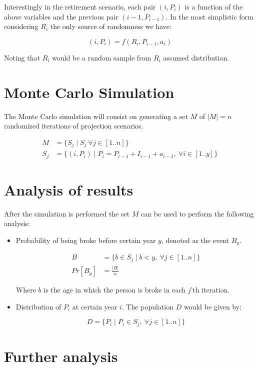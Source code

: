 \documentclass[8pt]{article}
\begin{document}
Interestingly in the retirement scenario, each pair $(i,P_i)$ is a function of the above variables and the previous pair $(i-1,P_{i-1})$.  In the most simplistic form considering \textbf{$R_i$} the only source of randomness we have:

\[ (i,P_i) = f(R_i, P_{i-1}, a_i) \]

Noting that $R_i$ would be a random sample from $R_i$ assumed distribution.

\section{Monte Carlo Simulation}

The Monte Carlo simulation will consist on generating a set $M$ of $|M|=n$ randomized iterations of projection scenarios.  

\begin{align*}
M & = \{ S_j \mid S_j ~ \forall j \in [1..n] \} \\
S_j & = \{(i,P_i) \mid  P_{i} = P_{i-1} + I_{i-1} + a_{i-1}, ~ \forall i \in [1..y] \}
\end{align*}

\section{Analysis of results}


After the simulation is performed the set $M$ can be used to perform the following analysis:

\begin{itemize}
\item Probability of being broke before certain year $y$, denoted as the event $B_y$.

\begin{align*}
B & = \{b \in S_j\mid b < y, ~ \forall j \in [1..n] \} \\
Pr[B_y] & = \frac{|B|}{n}
\end{align*}

Where $b$ is the age in which the person is broke in each $j$'th iteration.

\item Distribution of $P_i$ at certain year $i$.  The population $D$ would be given by:

\[D=\{P_i \mid P_i \in S_j, ~\forall j \in [1..n] \}\]

\end{itemize}

\section{Further analysis}
\end{document}
